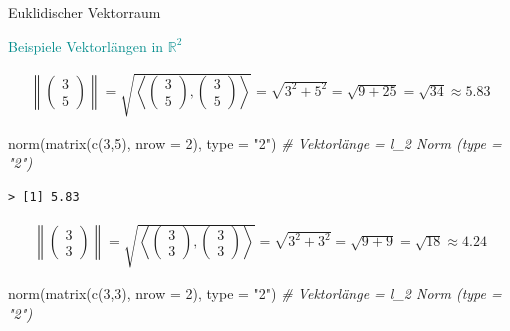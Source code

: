 \documentclass[
  8pt,
  ignorenonframetext,
]{beamer}
\newenvironment{Shaded}{\begin{snugshade}}{\end{snugshade}}
\newcommand{\AttributeTok}[1]{\textcolor[rgb]{0.77,0.63,0.00}{#1}}
\newcommand{\CommentTok}[1]{\textcolor[rgb]{0.56,0.35,0.01}{\textit{#1}}}
\newcommand{\DecValTok}[1]{\textcolor[rgb]{0.00,0.00,0.81}{#1}}
\newcommand{\FunctionTok}[1]{\textcolor[rgb]{0.00,0.00,0.00}{#1}}
\newcommand{\NormalTok}[1]{#1}
\newcommand{\StringTok}[1]{\textcolor[rgb]{0.31,0.60,0.02}{#1}}
\begin{document}
\begin{frame}[fragile]{Euklidischer Vektorraum}
\protect\hypertarget{euklidischer-vektorraum-5}{}
\vspace{3mm}

\textcolor{darkcyan}{Beispiele Vektorlängen in $\mathbb{R}^2$}

\footnotesize
{}

\begin{align*}
\left\lVert \begin{pmatrix}3\\5\end{pmatrix}\right\rVert = \sqrt{\left\langle \begin{pmatrix}3\\5\end{pmatrix} ,\begin{pmatrix}3\\5\end{pmatrix} \right\rangle} = \sqrt{3^2+5^2} = \sqrt{9+25} = \sqrt{34} \approx 5.83
\end{align*}

\begin{Shaded}
\begin{Highlighting}[]
\FunctionTok{norm}\NormalTok{(}\FunctionTok{matrix}\NormalTok{(}\FunctionTok{c}\NormalTok{(}\DecValTok{3}\NormalTok{,}\DecValTok{5}\NormalTok{), }\AttributeTok{nrow =} \DecValTok{2}\NormalTok{), }\AttributeTok{type =} \StringTok{"2"}\NormalTok{)  }\CommentTok{\# Vektorlänge = l\_2 Norm (type = "2")}
\end{Highlighting}
\end{Shaded}

\begin{verbatim}
> [1] 5.83
\end{verbatim}

\begin{align*}
\left\lVert \begin{pmatrix}3\\3\end{pmatrix}\right\rVert = \sqrt{\left\langle \begin{pmatrix}3\\3\end{pmatrix}, \begin{pmatrix}3\\3\end{pmatrix}\right\rangle} = \sqrt{3^2+3^2} = \sqrt{9+9} = \sqrt{18} \approx 4.24
\end{align*}

\begin{Shaded}
\begin{Highlighting}[]
\FunctionTok{norm}\NormalTok{(}\FunctionTok{matrix}\NormalTok{(}\FunctionTok{c}\NormalTok{(}\DecValTok{3}\NormalTok{,}\DecValTok{3}\NormalTok{), }\AttributeTok{nrow =} \DecValTok{2}\NormalTok{), }\AttributeTok{type =} \StringTok{"2"}\NormalTok{)  }\CommentTok{\# Vektorlänge = l\_2 Norm (type = "2")}
\end{Highlighting}
\end{Shaded}


\end{frame}
\end{document}
